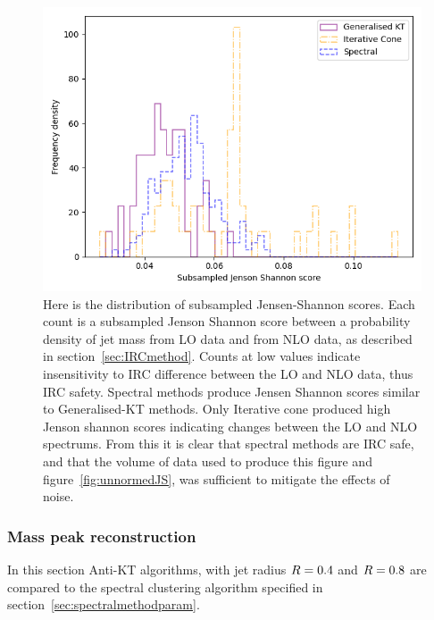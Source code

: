 \begin{figure}[htp]
    \begin{minipage}[c]{0.6\textwidth}
    \includegraphics[width=1.\textwidth]{graphics/JensenShannon.png}
    \end{minipage}\hfill
    \begin{minipage}[c]{0.35\textwidth}
    \caption{Here is the distribution of subsampled Jensen-Shannon scores.
        Each count is a subsampled Jenson Shannon score between a probability density of jet mass from LO data and
        from NLO data, as described in section~\ref{sec:IRCmethod}.
        Counts at low values indicate insensitivity to IRC difference between the LO and NLO data,
        thus IRC safety.
        Spectral methods produce Jensen Shannon scores similar to Generalised-KT
        methods. Only Iterative cone produced high Jenson shannon scores indicating changes
        between the LO and NLO spectrums.
        From this it is clear that spectral methods are IRC safe,
        and that the volume of data used to produce this figure and figure~\ref{fig:unnormedJS},
        was sufficient to mitigate the effects of noise.
    }\label{fig:jensenshannon}
    \end{minipage}
\end{figure}    


\FloatBarrier{}
\subsubsection{Mass peak reconstruction}
In this section Anti-KT algorithms, with jet radius \(R{} = 0.4\) and \(R{} = 0.8\)
are compared to the spectral clustering algorithm specified in section~\ref{sec:spectralmethodparam}.


